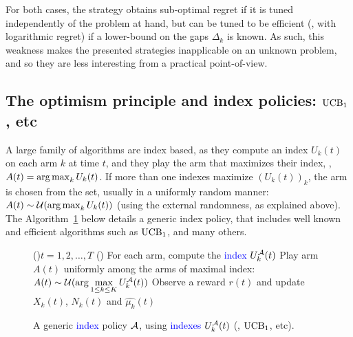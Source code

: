 For both cases, the strategy obtains sub-optimal regret if it is tuned independently of the problem at hand, but can be tuned to be efficient (\ie, with logarithmic regret) if a lower-bound on the gaps $\Delta_k$ is known.
As such, this weakness makes the presented strategies inapplicable on an unknown problem, and so they are less interesting from a practical point-of-view.


\subsection{The optimism principle and index policies: $\UCB_1$, \klUCB{} etc}
\label{sub:2:IndexPolicies}

A large family of algorithms are index based, as they compute an index $U_k(t)$ on each arm $k$ at time $t$,
and they play the arm that maximizes their index, \ie, $A(t) = \operatorname*{arg\,max}_k U_k(t)$.
If more than one indexes maximize $(U_k(t))_k$, the arm is chosen from the set, usually in a uniformly random manner: $A(t) \sim \mathcal{U}(\operatorname*{arg\,max}_k U_k(t))$ (using the external randomness, as explained above).
%
The Algorithm~\ref{algo:2:indexPolicy} below details a generic index policy, that includes well known and efficient algorithms such as $\UCB_1$, \klUCB{} and many others.

\begin{figure}[h!]
	\centering
    \begin{framed}
	\begin{algorithm}[H]
		\For(){$t = 1, 2, \dots, T$}{
			\uElse(){
                For each arm, compute the \textcolor{blue}{index $U_k^{\mathcal{A}}(t)$}\;
                Play arm $A(t)$ uniformly among the arms of maximal index: \textcolor{blue}{$A(t) \sim \mathcal{U}(\arg\max\limits_{1\leq k \leq K} U_k^{\mathcal{A}}(t))$}\;
            }
            Observe a reward $r(t)$ and update $X_k(t)$, $N_k(t)$ and $\widehat{\mu_k}(t)$\;
		}
		\caption[{A generic index policy $\cA$, using indexes $U_k(t)$ (\eg, $\UCB_1$, \klUCB{} etc).}]{A generic \textcolor{blue}{index} policy $\cA$, using \textcolor{blue}{indexes $U_k^{\mathcal{A}}(t)$} (\eg, $\UCB_1$, \klUCB{} etc).}
		\label{algo:2:indexPolicy}
	\end{algorithm}
	\end{framed}
\end{figure}


